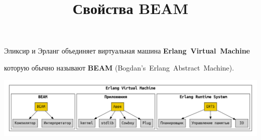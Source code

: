 \documentclass[10pt]{beamer}
\title{Свойства BEAM}
\begin{document}
\begin{frame}
  \centering
  Эликсир и Эрланг объединяет виртуальная машина
  \textbf{Erlang~Virtual~Machine}
  \par \bigskip
  которую обычно называют \textbf{BEAM}
  (Bogdan's~Erlang~Abstract~Machine).
\end{frame}

\begin{frame}
    \includegraphics[scale=0.2]{evm}
\end{frame}
\end{document}
